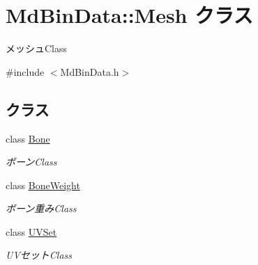 \hypertarget{class_md_bin_data_1_1_mesh}{}\section{Md\+Bin\+Data\+:\+:Mesh クラス}
\label{class_md_bin_data_1_1_mesh}


メッシュ\+Class  




{\ttfamily \#include $<$Md\+Bin\+Data.\+h$>$}

\subsection*{クラス}
\begin{DoxyCompactItemize}
\item 
class \mbox{\hyperlink{class_md_bin_data_1_1_mesh_1_1_bone}{Bone}}
\begin{DoxyCompactList}\small\item\em ボーン\+Class \end{DoxyCompactList}\item 
class \mbox{\hyperlink{class_md_bin_data_1_1_mesh_1_1_bone_weight}{Bone\+Weight}}
\begin{DoxyCompactList}\small\item\em ボーン重み\+Class \end{DoxyCompactList}\item 
class \mbox{\hyperlink{class_md_bin_data_1_1_mesh_1_1_u_v_set}{U\+V\+Set}}
\begin{DoxyCompactList}\small\item\em U\+Vセット\+Class \end{DoxyCompactList}\end{DoxyCompactItemize}
